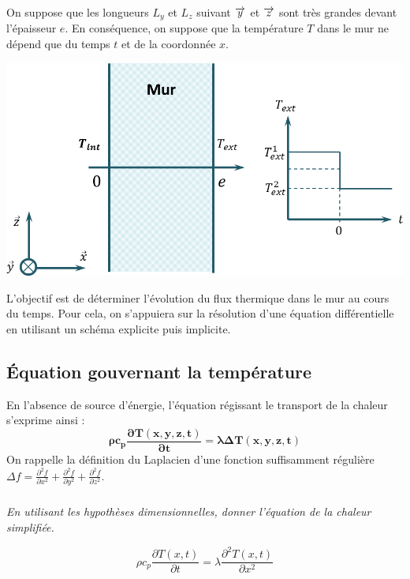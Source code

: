 \documentclass[10pt,fleqn]{article} %
\begin{document}
\begin{multicols}{2}
On suppose que les longueurs $L_y$ et $L_z$ suivant $\overrightarrow{y}$ et $\overrightarrow{z}$ sont très grandes devant l'épaisseur $e$. En conséquence, on suppose que la température $T$ dans le mur ne dépend que du temps $t$ et de la coordonnée $x$. 

\begin{center}
\includegraphics[width=\linewidth]{images/figure_01}
\end{center}




\begin{obj}
L'objectif est de déterminer l'évolution du flux thermique dans le mur au cours du temps. Pour cela, on s'appuiera sur la résolution d'une équation différentielle en utilisant un schéma explicite puis implicite.
\end{obj}
\fi
\subsection*{Équation gouvernant la température}
\ifprof
\else
En l'absence de source d'énergie, l'équation régissant le transport de la chaleur s'exprime ainsi :
\begin{equation}
\mathbf{\rho c_p \dfrac{\partial T(x,y,z,t)}{\partial t} =  \lambda  \Delta T(x,y,z,t)}
\end{equation}
On rappelle la définition du Laplacien d'une fonction suffisamment régulière 
$\Delta f =\frac{\partial^2 f}{\partial x^2}+\frac{\partial^2 f}{\partial y^2}
+\frac{\partial^2 f}{\partial z^2}$.
\fi

\subparagraph{}\textit{En utilisant les hypothèses dimensionnelles, donner l'équation de la chaleur simplifiée. }
\ifprof
\begin{corrige}
$$ 
\rho c_p \dfrac{\partial T(x,t)}{\partial t} =  \lambda  \dfrac{\partial^2 T(x,t)}{\partial x^2}
$$
\end{corrige}
\else
\fi


\end{multicols}
\end{document}
